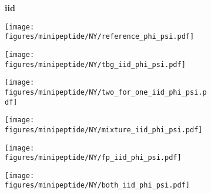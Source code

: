\begin{figure}
    \begin{minipage}{\textwidth}
        \begin{subfigure}[c]{0.05\textwidth}
        \vspace{-0.2cm}
            \textbf{iid}
        \end{subfigure}
        \begin{subfigure}[c]{0.15\textwidth}
            \centering
            \texttt{[image: figures/minipeptide/NY/reference\_phi\_psi.pdf]}
        \end{subfigure}
        \begin{subfigure}[c]{0.15\textwidth}
            \centering
            \texttt{[image: figures/minipeptide/NY/tbg\_iid\_phi\_psi.pdf]}
        \end{subfigure}
        \begin{subfigure}[c]{0.15\textwidth}
            \centering
            \texttt{[image: figures/minipeptide/NY/two\_for\_one\_iid\_phi\_psi.pdf]}
        \end{subfigure}
        \begin{subfigure}[c]{0.15\textwidth}
            \centering
            \texttt{[image: figures/minipeptide/NY/mixture\_iid\_phi\_psi.pdf]}
        \end{subfigure}
        \begin{subfigure}[c]{0.15\textwidth}
            \centering
            \texttt{[image: figures/minipeptide/NY/fp\_iid\_phi\_psi.pdf]}
        \end{subfigure}
        \begin{subfigure}[c]{0.15\textwidth}
            \centering
            \texttt{[image: figures/minipeptide/NY/both\_iid\_phi\_psi.pdf]}         
        \end{subfigure}
    \end{minipage}


\end{figure}
